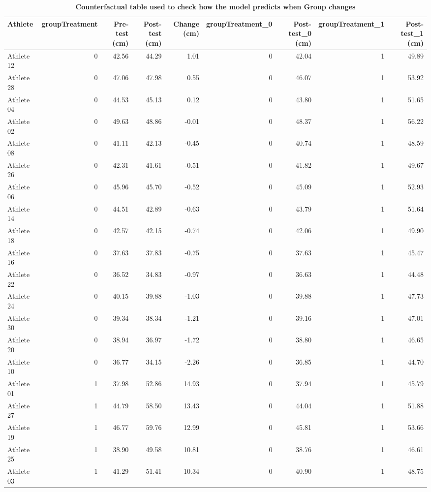 \documentclass[
]{book}
\begin{document}
\begin{table}

\caption{\label{tab:ancova-rct-counterfactual-group}\textbf{Counterfactual table used to check how the model predicts when Group changes}}
\centering
\begin{tabular}[t]{lrrrrrrrr}
\toprule
Athlete & groupTreatment & Pre-test (cm) & Post-test (cm) & Change (cm) & groupTreatment\_0 & Post-test\_0 (cm) & groupTreatment\_1 & Post-test\_1 (cm)\\
\midrule
Athlete 12 & 0 & 42.56 & 44.29 & 1.01 & 0 & 42.04 & 1 & 49.89\\
Athlete 28 & 0 & 47.06 & 47.98 & 0.55 & 0 & 46.07 & 1 & 53.92\\
Athlete 04 & 0 & 44.53 & 45.13 & 0.12 & 0 & 43.80 & 1 & 51.65\\
Athlete 02 & 0 & 49.63 & 48.86 & -0.01 & 0 & 48.37 & 1 & 56.22\\
Athlete 08 & 0 & 41.11 & 42.13 & -0.45 & 0 & 40.74 & 1 & 48.59\\
\addlinespace
Athlete 26 & 0 & 42.31 & 41.61 & -0.51 & 0 & 41.82 & 1 & 49.67\\
Athlete 06 & 0 & 45.96 & 45.70 & -0.52 & 0 & 45.09 & 1 & 52.93\\
Athlete 14 & 0 & 44.51 & 42.89 & -0.63 & 0 & 43.79 & 1 & 51.64\\
Athlete 18 & 0 & 42.57 & 42.15 & -0.74 & 0 & 42.06 & 1 & 49.90\\
Athlete 16 & 0 & 37.63 & 37.83 & -0.75 & 0 & 37.63 & 1 & 45.47\\
\addlinespace
Athlete 22 & 0 & 36.52 & 34.83 & -0.97 & 0 & 36.63 & 1 & 44.48\\
Athlete 24 & 0 & 40.15 & 39.88 & -1.03 & 0 & 39.88 & 1 & 47.73\\
Athlete 30 & 0 & 39.34 & 38.34 & -1.21 & 0 & 39.16 & 1 & 47.01\\
Athlete 20 & 0 & 38.94 & 36.97 & -1.72 & 0 & 38.80 & 1 & 46.65\\
Athlete 10 & 0 & 36.77 & 34.15 & -2.26 & 0 & 36.85 & 1 & 44.70\\
\addlinespace
Athlete 01 & 1 & 37.98 & 52.86 & 14.93 & 0 & 37.94 & 1 & 45.79\\
Athlete 27 & 1 & 44.79 & 58.50 & 13.43 & 0 & 44.04 & 1 & 51.88\\
Athlete 19 & 1 & 46.77 & 59.76 & 12.99 & 0 & 45.81 & 1 & 53.66\\
Athlete 25 & 1 & 38.90 & 49.58 & 10.81 & 0 & 38.76 & 1 & 46.61\\
Athlete 03 & 1 & 41.29 & 51.41 & 10.34 & 0 & 40.90 & 1 & 48.75\\

\end{tabular}
\end{table}
\end{document}
